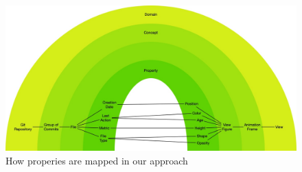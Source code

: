 \begin{figure}
    \center
    \includegraphics[width=\textwidth]{ApproachMapping.jpg}
    \caption{How properies are mapped in our approach}
    \label{fig:ApproachMapping}
\end{figure}



